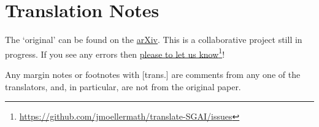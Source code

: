 \chapter*{Translation Notes}

The `original' can be found on the \href{https://arxiv.org/abs/math/0206203}{arXiv}.
This is a collaborative project still in progress. If you see any errors then \href{https://github.com/jmoellermath/translate-SGAI/issues}{please to let us know}\footnote{\url{https://github.com/jmoellermath/translate-SGAI/issues}}!

Any margin notes or footnotes with [trans.] are comments from any one of the translators, and, in particular, are not from the original paper.

